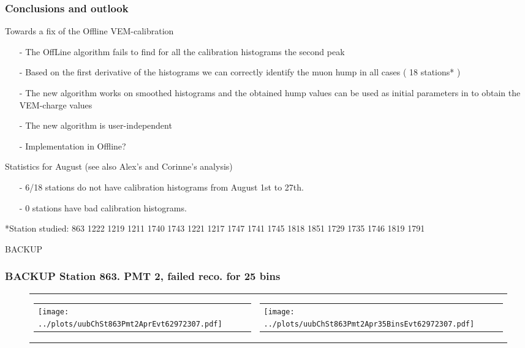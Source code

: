 \documentclass[aspectratio=169]{beamer}
\begin{document}
\begin{frame}
  \frametitle{Conclusions and outlook}
  Towards a fix of the Offline VEM-calibration  

  \begin{itemize}
    \item[-] The OffLine algorithm fails to find for all the calibration histograms the second peak
    \item[-] Based on the first derivative of the histograms we
      can correctly identify the muon hump in all cases ( 18 
      stations* )
      \item[-] The new algorithm works on smoothed histograms and
        the obtained hump values can be used as initial
        parameters in to obtain the VEM-charge values
      \item[-] The new algorithm is user-independent
    \item[-] Implementation in Offline?
  \end{itemize}

  Statistics for August (see also Alex's and Corinne's analysis)

  \begin{itemize}
    \item[-] 6/18 stations do not have calibration histograms
      from August 1st to 27th.
    \item[-] 0 stations have bad calibration histograms.
  \end{itemize}

  *Station studied: 863 1222 1219 1211 1740 1743 1221 1217 1747 1741 1745 1818 1851 1729 1735 1746 1819 1791


\end{frame}


\begin{frame}
  BACKUP
\end{frame}

\begin{frame} 
  \frametitle{BACKUP  Station 863. PMT 2, failed reco. for 25 bins}
  \begin{figure}
    \centering
    \begin{tabularx}{\textwidth}{CC}
      \begin{tabular}{l}
        \texttt{[image: ../plots/uubChSt863Pmt2AprEvt62972307.pdf]}
      \end{tabular}
      &
      \begin{tabular}{l}
        \texttt{[image: ../plots/uubChSt863Pmt2Apr35BinsEvt62972307.pdf]}
      \end{tabular}
    \end{tabularx}
  \end{figure}
\end{frame}
\end{document}
